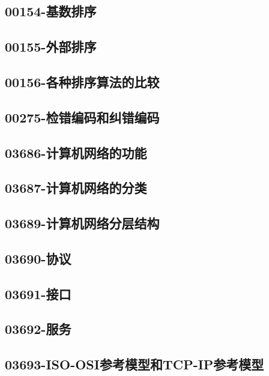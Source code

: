 \subsection{00154-基数排序}

\subsection{00155-外部排序}

\subsection{00156-各种排序算法的比较}

\subsection{00275-检错编码和纠错编码}

\subsection{03686-计算机网络的功能}

\subsection{03687-计算机网络的分类}

\subsection{03689-计算机网络分层结构}

\subsection{03690-协议}

\subsection{03691-接口}

\subsection{03692-服务}

\subsection{03693-ISO-OSI参考模型和TCP-IP参考模型}

